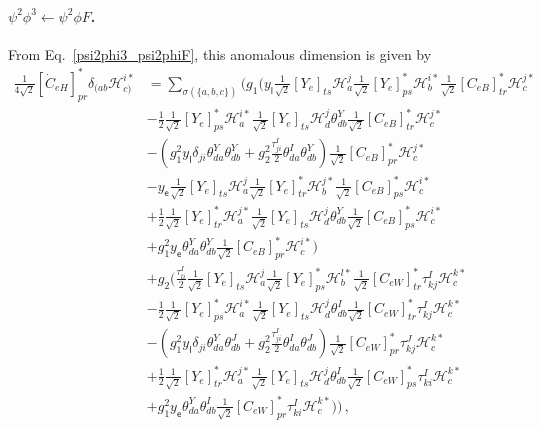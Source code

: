 \paragraph{$\psi^2\phi^3 \leftarrow \psi^2\phi F$.}
From Eq.~\eqref{psi2phi3_psi2phiF}, this anomalous dimension is given by
\begin{align}
    \frac{1}{4\sqrt{2}}[\dot C_{eH}]^*_{pr} \delta_{(ab}\mathcal H_{c)}^{i*} &= \sum_{\sigma(\{a,b,c\})} \Bigg(g_1 \Bigg(
    y_{\mathsf l}\frac{1}{\sqrt{2}}[Y_e]_{ts}\mathcal H_a^j \frac{1}{\sqrt{2}}[Y_e]^*_{ps}\mathcal H_b^{i*}\frac{1}{\sqrt{2}}[C_{eB}]^*_{tr}\mathcal H_c^{j*} \nonumber \\
    &- \frac{1}{2}\frac{1}{\sqrt{2}}[Y_e]^*_{ps}\mathcal H_a^{i*} \frac{1}{\sqrt{2}}[Y_e]_{ts}\mathcal H_d^{j}\theta^Y_{db}\frac{1}{\sqrt{2}}[C_{eB}]^*_{tr}\mathcal H_c^{j*}
    \nonumber \\&
    -\left(g_1^2 y_{\mathsf l}\delta_{ji}\theta^Y_{da}\theta^Y_{db}+g_2^2 \frac{\tau^I_{ji}}{2}\theta^I_{da}\theta^Y_{db}\right)\frac{1}{\sqrt{2}}[C_{eB}]^*_{pr}\mathcal H_c^{j*}
    \nonumber \\&
    -y_{\mathsf e}\frac{1}{\sqrt{2}}[Y_e]_{ts}\mathcal H_a^j \frac{1}{\sqrt{2}}[Y_e]^*_{tr}\mathcal H_b^{j*}\frac{1}{\sqrt{2}}[C_{eB}]^*_{ps}\mathcal H_c^{i*}
    \nonumber \\&
    +\frac{1}{2}\frac{1}{\sqrt{2}}[Y_e]^*_{tr}\mathcal H_a^{j*} \frac{1}{\sqrt{2}}[Y_e]_{ts}\mathcal H_d^{j}\theta^Y_{db}\frac{1}{\sqrt{2}}[C_{eB}]^*_{ps}\mathcal H_c^{i*}\nonumber \\&
    + g_1^2 y_{\mathsf e}\theta^Y_{da}\theta^Y_{db}\frac{1}{\sqrt{2}}[C_{eB}]^*_{pr}\mathcal H_c^{i*}
    \Bigg)
    \nonumber \\&
    +g_2 \Bigg(
    \frac{\tau^I_{li}}{2}\frac{1}{\sqrt{2}}[Y_e]_{ts}\mathcal H_a^j \frac{1}{\sqrt{2}}[Y_e]^*_{ps}\mathcal H_b^{l*}\frac{1}{\sqrt{2}}[C_{eW}]^*_{tr}\tau^I_{kj}\mathcal H_c^{k*}
    \nonumber \\&
    -\frac{1}{2}\frac{1}{\sqrt{2}}[Y_e]^*_{ps}\mathcal H_a^{i*} \frac{1}{\sqrt{2}}[Y_e]_{ts}\mathcal H_d^{j}\theta^I_{db}\frac{1}{\sqrt{2}}[C_{eW}]^*_{tr}\tau^I_{kj}\mathcal H_c^{k*}
    \nonumber \\&
    -\left(g_1^2 y_{\mathsf l}\delta_{ji}\theta^Y_{da}\theta^J_{db}+g_2^2 \frac{\tau^I_{ji}}{2}\theta^I_{da}\theta^J_{db}\right)\frac{1}{\sqrt{2}}[C_{eW}]^*_{pr}\tau^J_{kj}\mathcal H_c^{k*}
    \nonumber \\&
    +\frac{1}{2}\frac{1}{\sqrt{2}}[Y_e]^*_{tr}\mathcal H_a^{j*} \frac{1}{\sqrt{2}}[Y_e]_{ts}\mathcal H_d^{j}\theta^I_{db}\frac{1}{\sqrt{2}}[C_{eW}]^*_{ps}\tau^I_{ki}\mathcal H_c^{k*}
    \nonumber \\&
    +g_1^2 y_{\mathsf e}\theta^Y_{da}\theta^I_{db}\frac{1}{\sqrt{2}}[C_{eW}]^*_{pr}\tau^I_{ki}\mathcal H_c^{k*}
    \Bigg)
    \Bigg)
    \,,
\end{align}
